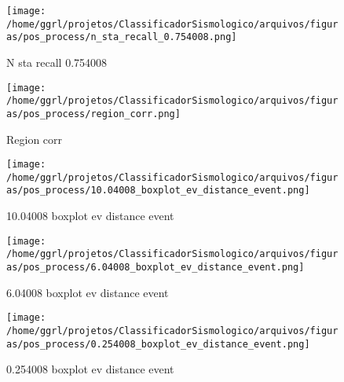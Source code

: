                     \begin{figure}[H]
                        \centering
                        \texttt{[image: /home/ggrl/projetos/ClassificadorSismologico/arquivos/figuras/pos\_process/n\_sta\_recall\_0.754008.png]}
                        \caption{N sta recall 0.754008}
                        \label{fig:n_sta_recall_0.754008}
                    \end{figure}
                

                    \begin{figure}[H]
                        \centering
                        \texttt{[image: /home/ggrl/projetos/ClassificadorSismologico/arquivos/figuras/pos\_process/region\_corr.png]}
                        \caption{Region corr}
                        \label{fig:region_corr}
                    \end{figure}
                

                    \begin{figure}[H]
                        \centering
                        \texttt{[image: /home/ggrl/projetos/ClassificadorSismologico/arquivos/figuras/pos\_process/10.04008\_boxplot\_ev\_distance\_event.png]}
                        \caption{10.04008 boxplot ev distance event}
                        \label{fig:10.04008_boxplot_ev_distance_event}
                    \end{figure}
                

                    \begin{figure}[H]
                        \centering
                        \texttt{[image: /home/ggrl/projetos/ClassificadorSismologico/arquivos/figuras/pos\_process/6.04008\_boxplot\_ev\_distance\_event.png]}
                        \caption{6.04008 boxplot ev distance event}
                        \label{fig:6.04008_boxplot_ev_distance_event}
                    \end{figure}
                

                    \begin{figure}[H]
                        \centering
                        \texttt{[image: /home/ggrl/projetos/ClassificadorSismologico/arquivos/figuras/pos\_process/0.254008\_boxplot\_ev\_distance\_event.png]}
                        \caption{0.254008 boxplot ev distance event}
                        \label{fig:0.254008_boxplot_ev_distance_event}
                    \end{figure}
                


